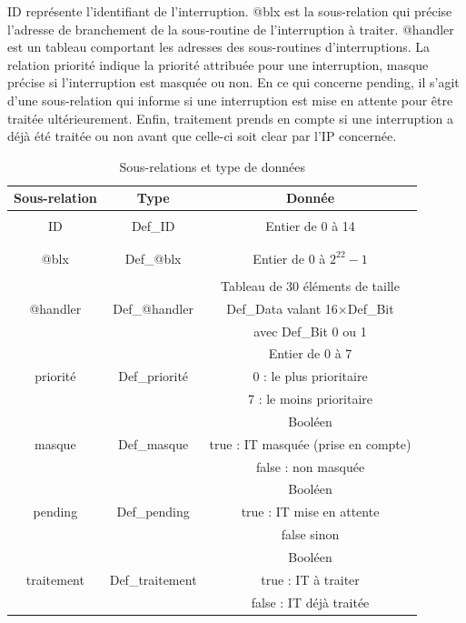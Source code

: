 ID représente l'identifiant de l'interruption.
@blx est la sous-relation qui précise l'adresse de branchement de la sous-routine de l'interruption à traiter. @handler est un tableau comportant les adresses des sous-routines d'interruptions.
La relation priorité indique la priorité attribuée pour une interruption, masque précise si l'interruption est masquée ou non.
En ce qui concerne pending, il s'agit d'une sous-relation qui informe si une interruption est mise en attente pour être traitée ultérieurement.
Enfin, traitement prends en compte si une interruption a déjà été traitée ou non avant que celle-ci soit clear par l'IP concernée.

\begin{table}[H]
	\centering
	\begin{tabular}{|c|c|c|}
		\hline
		Sous-relation & Type            & Donnée                              \\
		\hline
		& & \\
		ID & Def\_ID & Entier de 0 à 14\\
		& & \\
		\hline
		& & \\
		@blx & Def\_@blx & Entier de 0 à $2^{22}-1$\\
		& & \\
		\hline
		& & Tableau de 30 éléments de taille\\
		@handler & Def\_@handler & Def\_Data valant 16$\times$Def\_Bit\\
		& & avec Def\_Bit 0 ou 1\\
		\hline
		& & Entier de 0 à 7\\
		priorité & Def\_priorité & 0 : le plus prioritaire\\
		& & 7 : le moins prioritaire\\
		\hline
		              &                 & Booléen                             \\
		masque        & Def\_masque     & true : IT masquée (prise en compte) \\
		              &                 & false : non masquée                 \\
		\hline
		              &                 & Booléen                             \\
		pending       & Def\_pending    & true : IT mise en attente           \\
		              &                 & false sinon                         \\
		\hline
		              &                 & Booléen                             \\
		traitement    & Def\_traitement & true : IT à traiter                 \\
		              &                 & false : IT déjà traitée             \\
		\hline
	\end{tabular}
	\caption{Sous-relations et type de données}
	\label{tab:sous-relation}
\end{table}

